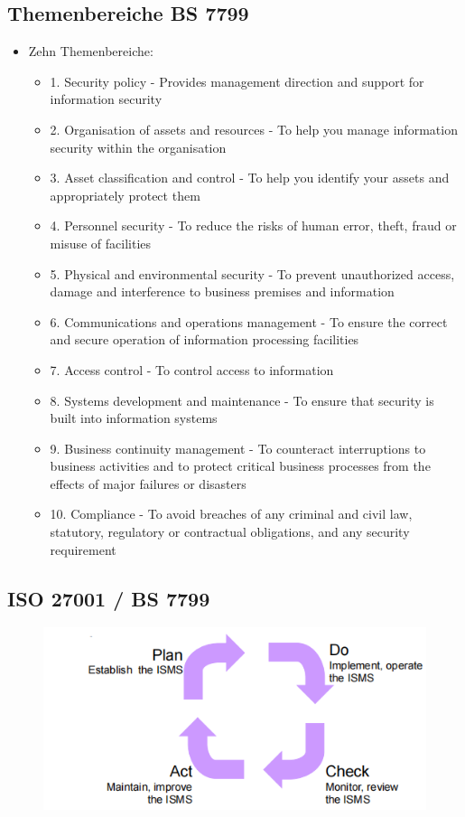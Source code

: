 \documentclass[openany]{book}
\begin{document}
\subsection{Themenbereiche BS 7799}

\begin{itemize}
    \item Zehn Themenbereiche:
    \begin{itemize}
        \item 1. Security policy - Provides management direction and support for information security
        \item 2. Organisation of assets and resources - To help you manage information security within the organisation
        \item 3. Asset classification and control - To help you identify your assets and appropriately protect them
        \item 4. Personnel security - To reduce the risks of human error, theft, fraud or misuse of facilities
        \item 5. Physical and environmental security - To prevent unauthorized access, damage and interference to business premises and information
        \item 6. Communications and operations management - To ensure the correct and secure operation of information processing facilities
        \item 7. Access control - To control access to information
        \item 8. Systems development and maintenance - To ensure that security is built into information systems
        \item 9. Business continuity management - To counteract interruptions to business activities and to protect critical business processes from the effects of major failures or disasters
        \item 10. Compliance - To avoid breaches of any criminal and civil law, statutory, regulatory or contractual obligations, and any security requirement
    \end{itemize}
\end{itemize}

\subsection{ISO 27001 / BS 7799}

\begin{figure}[h!]
    \centering
    \includegraphics[width=0.85\linewidth]{Pics/BS7799.PNG}
\end{figure}
\end{document}
